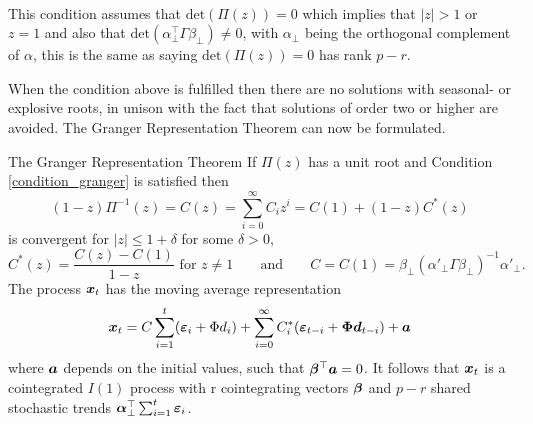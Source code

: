 \begin{condition}\phantom{}\\
    This condition assumes that $\text{det}(\Pi(z))=0$ which implies that $|z|>1$ or $z=1$ and also that $\text{det}(\alpha^\top_{\perp}\Gamma \beta_{\perp})\neq0$, with $\alpha_{\perp}$ being the orthogonal complement of $\alpha$, this is the same as saying $\text{det}(\Pi(z))=0$ has rank $p-r$.
    \label{condition_granger}
\end{condition}

\noindent When the condition above is fulfilled then there are no solutions with seasonal- or explosive roots, in unison with the fact that solutions of order two or higher are avoided. The Granger Representation Theorem can now be formulated.
\begin{thm}{The Granger Representation Theorem}
    If $\Pi(z)$ has a unit root and Condition \ref{condition_granger} is satisfied then
    \begin{equation}\label{Granger_representation_eq_1}
        (1-z)\Pi^{-1}(z)=C(z)=\sum^{\infty}_{i=0}C_iz^i=C(1)+(1-z)C^\ast(z)
    \end{equation}
    is convergent for $|z|\leq1+\delta
    $ for some $\delta>0$,
    \begin{equation*}
C^{\ast}(z)=\frac{C(z)-C(1)}{1-z}\text{ for }z\neq 1\;\;\;\;\;\;\;\text{and}\;\;\;\;\;\;\;C=C(1)=\beta_\perp(\alpha'_{\perp}\Gamma\beta_{\perp})^{-1}\alpha'_{\perp}.
    \end{equation*}
The process $\boldsymbol{x}_t$ has the moving average representation
\begin{equation}\label{granger_representation_eq_3}
    \boldsymbol{x}_t=C\sum_{i=1}^{t}(\boldsymbol{\varepsilon}_{i}+\Phi d_i)+\sum_{i=0}^{\infty}C_{i}^\ast(\boldsymbol{\varepsilon}_{t-i}+\boldsymbol{\Phi} \boldsymbol{d}_{t-i})+\boldsymbol{a}
\end{equation}
where $\boldsymbol{a}$ depends on the initial values, such that $\boldsymbol{\beta}^\top\boldsymbol{a}=0$. It follows that $\boldsymbol{x}_t$ is a cointegrated $I(1)$ process with r cointegrating vectors $\boldsymbol{\beta}$ and $p-r$ shared stochastic trends $\boldsymbol{\alpha}^\top_{\perp}\sum_{i=1}^{t}\boldsymbol{\varepsilon}_i$.
\end{thm}

